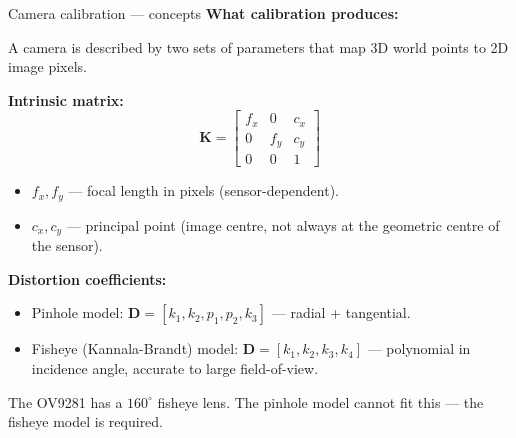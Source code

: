\documentclass[10pt,aspectratio=169]{beamer}
\begin{document}
\begin{frame}{Camera calibration --- concepts}
\textbf{What calibration produces:}

A camera is described by two sets of parameters that map 3D world points to 2D image pixels.

\textbf{Intrinsic matrix:}
\[
\mathbf{K} = \begin{bmatrix} f_x & 0 & c_x \\ 0 & f_y & c_y \\ 0 & 0 & 1 \end{bmatrix}
\]
\begin{itemize}
    \item $f_x, f_y$ --- focal length in pixels (sensor-dependent).
    \item $c_x, c_y$ --- principal point (image centre, not always at the geometric centre of the sensor).
\end{itemize}

\textbf{Distortion coefficients:}
\begin{itemize}
    \item Pinhole model: $\mathbf{D} = [k_1, k_2, p_1, p_2, k_3]$ --- radial + tangential.
    \item Fisheye (Kannala-Brandt) model: $\mathbf{D} = [k_1, k_2, k_3, k_4]$ --- polynomial in incidence angle, accurate to large field-of-view.
\end{itemize}

The OV9281 has a $160^\circ$ fisheye lens. The pinhole model cannot fit this --- the fisheye model is required.
\end{frame}
\end{document}
